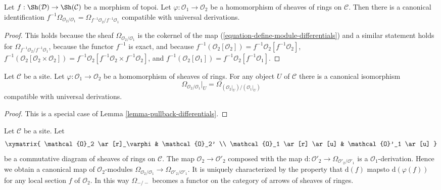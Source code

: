 \begin{lemma}
\label{lemma-pullback-differentials}
Let $f : \Sh(\mathcal{D}) \to \Sh(\mathcal{C})$ be a morphism of topoi.
Let $\varphi : \mathcal{O}_1 \to \mathcal{O}_2$
be a homomorphism of sheaves of rings on $\mathcal{C}$.
Then there is a canonical identification
$f^{-1}\Omega_{\mathcal{O}_2/\mathcal{O}_1} =
\Omega_{f^{-1}\mathcal{O}_2/f^{-1}\mathcal{O}_1}$
compatible with universal derivations.
\end{lemma}

\begin{proof}
This holds because the sheaf $\Omega_{\mathcal{O}_2/\mathcal{O}_1}$
is the cokernel of the map (\ref{equation-define-module-differentials})
and a similar statement holds for
$\Omega_{f^{-1}\mathcal{O}_2/f^{-1}\mathcal{O}_1}$,
because the functor $f^{-1}$ is exact, and because
$f^{-1}(\mathcal{O}_2[\mathcal{O}_2]) =
f^{-1}\mathcal{O}_2[f^{-1}\mathcal{O}_2]$,
$f^{-1}(\mathcal{O}_2[\mathcal{O}_2 \times \mathcal{O}_2]) =
f^{-1}\mathcal{O}_2[f^{-1}\mathcal{O}_2 \times f^{-1}\mathcal{O}_2]$, and
$f^{-1}(\mathcal{O}_2[\mathcal{O}_1]) =
f^{-1}\mathcal{O}_2[f^{-1}\mathcal{O}_1]$.
\end{proof}

\begin{lemma}
\label{lemma-localize-differentials}
Let $\mathcal{C}$ be a site. Let $\varphi : \mathcal{O}_1 \to \mathcal{O}_2$
be a homomorphism of sheaves of rings. For any object $U$ of $\mathcal{C}$
there is a canonical isomorphism
$$
\Omega_{\mathcal{O}_2/\mathcal{O}_1}|_U =
\Omega_{(\mathcal{O}_2|_U)/(\mathcal{O}_1|_U)}
$$
compatible with universal derivations.
\end{lemma}

\begin{proof}
This is a special case of Lemma \ref{lemma-pullback-differentials}.
\end{proof}

\begin{lemma}
\label{lemma-functoriality-differentials}
Let $\mathcal{C}$ be a site. Let
$$
\xymatrix{
\mathcal{O}_2 \ar[r]_\varphi & \mathcal{O}_2' \\
\mathcal{O}_1 \ar[r] \ar[u] & \mathcal{O}'_1 \ar[u]
}
$$
be a commutative diagram of sheaves of rings on $\mathcal{C}$. The map
$\mathcal{O}_2 \to \mathcal{O}'_2$ composed with the map
$\text{d} : \mathcal{O}'_2 \to \Omega_{\mathcal{O}'_2/\mathcal{O}'_1}$
is a $\mathcal{O}_1$-derivation. Hence we obtain a canonical map of
$\mathcal{O}_2$-modules
$\Omega_{\mathcal{O}_2/\mathcal{O}_1} \to
\Omega_{\mathcal{O}'_2/\mathcal{O}'_1}$.
It is uniquely characterized by the property that
$\text{d}(f)$ mapsto $\text{d}(\varphi(f))$
for any local section $f$ of $\mathcal{O}_2$.
In this way $\Omega_{-/-}$ becomes a functor on the category
of arrows of sheaves of ringes.
\end{lemma}

